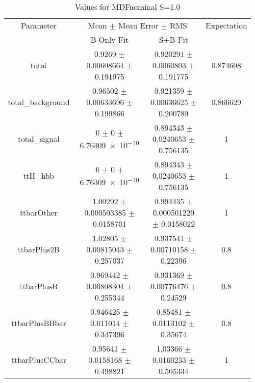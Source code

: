 \begin{table}
\centering
\caption{Values for MDFnominal S=1.0}
\begin{tabular}{cccc}
\toprule
Parameter & \multicolumn{2}{c}{Mean $\pm$ Mean Error $\pm$ RMS} & Expectation\\
 & B-Only Fit & S+B Fit & \\
\midrule
total & \num{0.9269} $\pm$ \num{0.00608664} $\pm$ \num{0.191975} & \num{0.920291} $\pm$ \num{0.0060803} $\pm$ \num{0.191775} & \num{0.874608}\\
total\_background & \num{0.96502} $\pm$ \num{0.00633696} $\pm$ \num{0.199866} & \num{0.921359} $\pm$ \num{0.00636625} $\pm$ \num{0.200789} & \num{0.866629}\\
total\_signal & \num{0} $\pm$ \num{0} $\pm$ \num{6.76309e-10} & \num{0.894343} $\pm$ \num{0.0240653} $\pm$ \num{0.756135} & \num{1}\\
ttH\_hbb & \num{0} $\pm$ \num{0} $\pm$ \num{6.76309e-10} & \num{0.894343} $\pm$ \num{0.0240653} $\pm$ \num{0.756135} & \num{1}\\
ttbarOther & \num{1.00292} $\pm$ \num{0.000503385} $\pm$ \num{0.0158701} & \num{0.994435} $\pm$ \num{0.000501229} $\pm$ \num{0.0158022} & \num{1}\\
ttbarPlus2B & \num{1.02805} $\pm$ \num{0.00815043} $\pm$ \num{0.257037} & \num{0.937541} $\pm$ \num{0.00710158} $\pm$ \num{0.22396} & \num{0.8}\\
ttbarPlusB & \num{0.969442} $\pm$ \num{0.00808304} $\pm$ \num{0.255344} & \num{0.931369} $\pm$ \num{0.00776476} $\pm$ \num{0.24529} & \num{0.8}\\
ttbarPlusBBbar & \num{0.946425} $\pm$ \num{0.011014} $\pm$ \num{0.347396} & \num{0.85481} $\pm$ \num{0.0113102} $\pm$ \num{0.35674} & \num{0.8}\\
ttbarPlusCCbar & \num{0.95641} $\pm$ \num{0.0158168} $\pm$ \num{0.498821} & \num{1.03366} $\pm$ \num{0.0160233} $\pm$ \num{0.505334} & \num{1}\\
\bottomrule
\end{tabular}
\end{table}